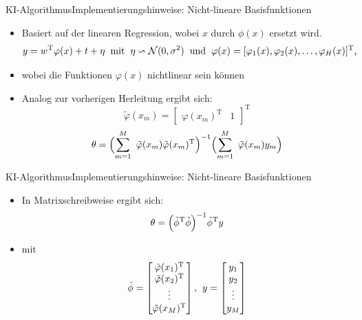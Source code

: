 \documentclass[169, handout	]{THIbeamer} %
\begin{document}
	\begin{frame}{KI-Algorithmus}{Implementierungshinweise: Nicht-lineare Basisfunktionen}
		\begin{itemize}
			\item Basiert auf der linearen Regression, wobei $x$ durch $\phi (x)$ ersetzt wird.
			\begin{equation}
				y = w^{\text{T}} \varphi (x) + t + \eta
				\hspace{0.2 cm}
				\text{mit}
				\hspace{0.2 cm}
				\eta \backsim \mathcal{N}(0, \sigma^2)
				\hspace{0.2 cm}
				\text{und} \hspace{0.2 cm} 			
				\varphi (x) = [ \varphi_1 (x), \varphi_2 (x), \dots, \varphi_H (x)]^{\text{T}} \text{,}
			\end{equation}
			\item[] wobei die Funktionen $\varphi (x)$ nichtlinear sein können
			\item Analog zur vorherigen Herleitung ergibt sich:
			\begin{equation}
				\tilde{\varphi} (x_m)= 
				\begin{bmatrix}
					\varphi (x_m)^{\text{T}} & 1
				\end{bmatrix}^{\text{T}}
			\end{equation}
			\begin{equation}
				\theta = \Bigl( \sum_{m=1}^M\ \tilde{\varphi} (x_m) \tilde{\varphi} (x_m)^{\text{T}} \Bigr)^{-1} \Bigl( \sum_{m=1}^M\ \tilde{\varphi} (x_m) y_m \Bigr) 
			\end{equation}
		\end{itemize}
	\end{frame}
	\begin{frame}{KI-Algorithmus}{Implementierungshinweise: Nicht-lineare Basisfunktionen}
		\begin{itemize}
			\item In Matrixschreibweise ergibt sich:			
		\begin{equation}
			\theta = \Bigl( \tilde{\phi}^{\text{T}} \tilde{\phi} \Bigr) ^{-1} \tilde{\phi}^{\text{T}} y
		\end{equation}
		\item[] mit
		\begin{equation}
			\tilde{\phi} =
			\begin{bmatrix}
				\tilde{\varphi} (x_1)^{\text{T}} \\
				\tilde{\varphi} (x_2)^{\text{T}} \\
				\vdots \\
				\tilde{\varphi} (x_M)^{\text{T}} \\			
			\end{bmatrix}
			\text{,}
			\hspace{0.2 cm}
			y = 
			\begin{bmatrix}
				y_1 \\
				y_2 \\
				\vdots \\
				y_M
			\end{bmatrix}
		\end{equation}
		\end{itemize}	
	\end{frame}			
\end{document}
